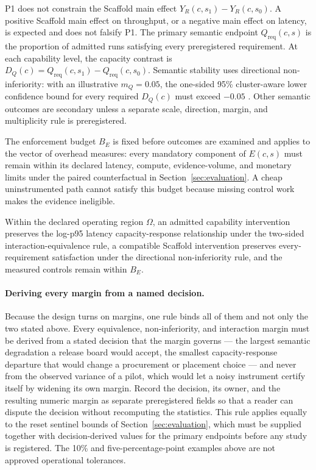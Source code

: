P1 does not constrain the Scaffold main effect $Y_R(c,s_1)-Y_R(c,s_0)$. A positive Scaffold main effect on throughput, or a negative main effect on latency, is expected and does not falsify P1. The primary semantic endpoint $Q_{\mathrm{req}}(c,s)$ is the proportion of admitted runs satisfying every preregistered requirement. At each capability level, the capacity contrast is $D_Q(c)=Q_{\mathrm{req}}(c,s_1)-Q_{\mathrm{req}}(c,s_0)$. Semantic stability uses directional non-inferiority: with an illustrative $m_Q=0.05$, the one-sided 95\% cluster-aware lower confidence bound for every required $D_Q(c)$ must exceed $-0.05$ \cite{piaggio2012noninferiority}. Other semantic outcomes are secondary unless a separate scale, direction, margin, and multiplicity rule is preregistered.

The enforcement budget $B_E$ is fixed before outcomes are examined and applies to the vector of overhead measures: every mandatory component of $E(c,s)$ must remain within its declared latency, compute, evidence-volume, and monetary limits under the paired counterfactual in Section~\ref{sec:evaluation}. A cheap uninstrumented path cannot satisfy this budget because missing control work makes the evidence ineligible.

\begin{proposition}
\label{prop:p1}
Within the declared operating region $\Omega$, an admitted capability intervention preserves the log-p95 latency capacity-response relationship under the two-sided interaction-equivalence rule, a compatible Scaffold intervention preserves every-requirement satisfaction under the directional non-inferiority rule, and the measured controls remain within $B_E$.
\end{proposition}

\paragraph{Deriving every margin from a named decision.}
Because the design turns on margins, one rule binds all of them and not only the two stated above. Every equivalence, non-inferiority, and interaction margin must be derived from a stated decision that the margin governs --- the largest semantic degradation a release board would accept, the smallest capacity-response departure that would change a procurement or placement choice --- and never from the observed variance of a pilot, which would let a noisy instrument certify itself by widening its own margin. Record the decision, its owner, and the resulting numeric margin as separate preregistered fields so that a reader can dispute the decision without recomputing the statistics. This rule applies equally to the reset sentinel bounds of Section~\ref{sec:evaluation}, which must be supplied together with decision-derived values for the primary endpoints before any study is registered. The 10\% and five-percentage-point examples above are not approved operational tolerances.


